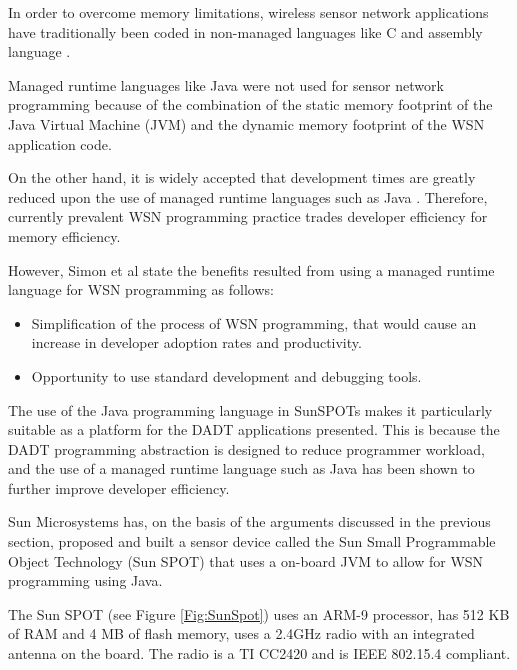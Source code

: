 In order to overcome memory limitations, wireless sensor network applications
have traditionally been coded in non-managed languages like C and assembly
language \cite{simon_squawk:2006}.
 
Managed runtime languages like Java were not used for sensor network programming
because of the combination of the static memory footprint of the Java Virtual
Machine (JVM) and the dynamic memory footprint of the WSN application code.
 
On the other hand, it is widely accepted that development times are greatly reduced
upon the use of managed runtime languages such as Java
\cite{simon_squawk:2006}. Therefore, currently prevalent WSN programming practice
trades developer efficiency for memory efficiency. 

However, Simon et al \cite{simon_squawk:2006} state the benefits resulted from
using a managed runtime language for WSN programming as follows:

\begin{itemize}
  \item Simplification of the process of WSN programming, that would cause an
  increase in developer adoption rates and productivity.
  \item Opportunity to use standard development and debugging tools.
\end{itemize}

The use of the Java programming language in SunSPOTs makes it particularly
suitable as a platform for the DADT applications presented. This is because the
DADT programming abstraction is designed to reduce programmer workload, and the
use of a managed runtime language such as Java has been shown to further
improve developer efficiency.
 
Sun Microsystems has, on the basis of the arguments discussed in the previous
section, proposed and built a sensor device
called the Sun Small Programmable Object Technology (Sun SPOT) that uses a
on-board JVM to allow for WSN programming using Java.

The Sun SPOT (see Figure \ref{Fig:SunSpot}) uses an ARM-9 processor, has 512 KB of RAM
and 4 MB of flash memory, uses a 2.4GHz radio with an integrated antenna on the board. The radio
is a TI CC2420 and is IEEE 802.15.4 compliant.

